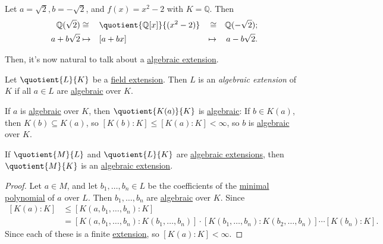 \begin{eg}
	Let \(a=\sqrt{2}, b=-\sqrt{2} \), and \(f(x) = x^2 - 2\) with \(K=\mathbb{Q} \). Then
	\[
		\begin{aligned}
			\mathbb{Q} (\sqrt{2} ) & \cong   &  & \quotient{\mathbb{Q} [x]}{(x^2 - 2)} & \cong   &  & \mathbb{Q} (-\sqrt{2} ); \\
			a+b\sqrt{2}            & \mapsto &  & [a+bx]                               & \mapsto &  & a-b\sqrt{2}.
		\end{aligned}
	\]
\end{eg}

Then, it's now natural to talk about a \hyperref[def:algebraic-extension]{algebraic extension}.

\begin{definition}\label{def:algebraic-extension}
	Let \(\quotient{L}{K} \) be a \hyperref[def:field-extension]{field extension}. Then \(L\) is an \emph{algebraic extension} of \(K\) if all \(a\in L\) are \hyperref[def:algebraic]{algebraic} over \(K\).
\end{definition}

If \(a\) is \hyperref[def:algebraic]{algebraic} over \(K\), then \(\quotient{K(a)}{K} \) is \hyperref[def:algebraic-extension]{algebraic}: If \(b\in K(a)\), then \(K(b) \subseteq K(a)\), so \([K(b) \colon K] \leq [K(a) \colon K] < \infty \), so \(b\) is \hyperref[def:algebraic]{algebraic} over \(K\).

\begin{theorem}
	If \(\quotient{M}{L} \) and \(\quotient{L}{K} \) are \hyperref[def:algebraic-extension]{algebraic extensions}, then \(\quotient{M}{K} \) is an \hyperref[def:algebraic-extension]{algebraic extension}.
\end{theorem}
\begin{proof}
	Let \(a\in M\), and let \(b_1, \dots , b_n\in L\) be the coefficients of the \hyperref[def:minimal-polynomial]{minimal polynomial} of \(a\) over \(L\). Then \(b_1, \dots , b_n\) are \hyperref[def:algebraic]{algebraic} over \(K\). Since
	\[
		\begin{split}
			[K(a) \colon K]
			&\leq [K(a, b_1, \dots , b_n) \colon K]\\
			&= [K(a, b_1, \dots , b_n) \colon K(b_1, \dots , b_n)] \cdot [K(b_1, \dots , b_n) \colon K(b_2, \dots , b_n)] \cdots [K(b_n) \colon K].
		\end{split}
	\]
	Since each of these is a finite \hyperref[def:field-extension]{extension}, so \([K(a) \colon K] < \infty \).
\end{proof}

